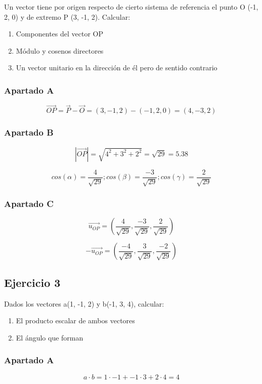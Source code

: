 Un vector tiene por origen respecto de cierto sistema
de referencia el punto O (-1, 2, 0) y de extremo
P (3, -1, 2). Calcular:
\begin{enumerate}[label=\Alph*)]
  \item Componentes del vector OP
  \item Módulo y cosenos directores
  \item Un vector unitario en la dirección de él pero de sentido contrario
\end{enumerate}

\subsubsection{Apartado A}
  $$
  \overrightarrow{OP} = \overrightarrow{P} - \overrightarrow{O} 
  = (3, -1, 2) - (-1, 2, 0) = (4, -3, 2)
  $$

\subsubsection{Apartado B}
  $$
  \left\lvert \overrightarrow{OP} \right\rvert
  = \sqrt{4^2 + 3^2 + 2^2} = \sqrt{29} = 5.38
  $$

  $$
  cos(\alpha) = \frac{4}{\sqrt{29}};
  cos(\beta) = \frac{-3}{\sqrt{29}};
  cos(\gamma) = \frac{2}{\sqrt{29}}
  $$

\subsubsection{Apartado C}
  $$
  \overrightarrow{u_{OP}}
  = (\frac{4}{\sqrt{29}}, \frac{-3}{\sqrt{29}}, \frac{2}{\sqrt{29}})
  $$

  $$
  -\overrightarrow{u_{OP}}
  = (\frac{-4}{\sqrt{29}}, \frac{3}{\sqrt{29}}, \frac{-2}{\sqrt{29}})
  $$

\subsection{Ejercicio 3}

Dados los vectores a(1, -1, 2) y b(-1, 3, 4),
calcular:
\begin{enumerate}[label=\Alph*)]
  \item El producto escalar de ambos vectores
  \item El ángulo que forman
\end{enumerate}

\subsubsection{Apartado A}
  $$
  a\cdot b = 1\cdot -1 + -1\cdot 3 + 2\cdot 4
  = 4
  $$


